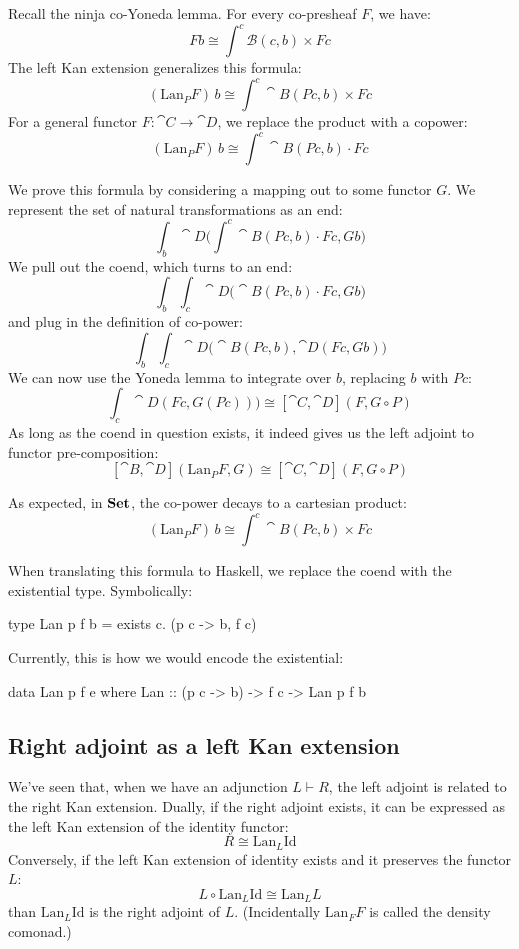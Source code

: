 \documentclass[DaoFP]{subfiles}
\begin{document}
Recall the ninja co-Yoneda lemma. For every co-presheaf $F$, we have:
\[ F b \cong \int^{c} \mathcal{B}(c, b) \times F c \]
The left Kan extension generalizes this formula:
\[ (\text{Lan}_P F)\, b \cong \int^{c} \cat B (P c, b) \times F c \]
For a general functor $F \colon \cat C \to \cat D$, we replace the product with a copower:
\[ (\text{Lan}_P F)\, b \cong \int^{c} \cat B(P c, b) \cdot F c \]

We prove this formula by considering a mapping out to some functor $G$. We represent the set of natural transformations as an end:
\[\int_b \cat D \big(\int^c \cat B(P c, b) \cdot F c, G b\big) \]
We pull out the coend, which turns to an end:
\[\int_b \int_c \cat D \big(\cat B(P c, b) \cdot F c, G b\big) \]
and plug in the definition of co-power:
\[\int_b \int_c \cat D \big(\cat B(P c, b), \cat D (F c, G b)\big) \]
We can now use the Yoneda lemma to integrate over $b$, replacing $b$ with $P c$:
\[\int_c \cat D (F c, G (P c))\big) \cong  [\cat C, \cat D] (F, G \circ P) \]
As long as the coend in question exists, it indeed gives us the left adjoint to functor pre-composition:
\[ [\cat B, \cat D](\text{Lan}_P F , G) \cong  [\cat C, \cat D] (F, G \circ P) \]

As expected, in $\mathbf{Set}$, the co-power decays to a cartesian product:
\[ (\text{Lan}_P F)\, b \cong \int^{c} \cat B (P c, b) \times F c \]

When translating this formula to Haskell, we replace the coend with the existential type. Symbolically:
 \begin{haskell}
 type Lan p f b = exists c. (p c -> b, f c)
 \end{haskell}
Currently, this is how we would encode the existential:
 \begin{haskell}
 data Lan p f e where
   Lan :: (p c -> b) -> f c -> Lan p f b
 \end{haskell}
 
\subsection{Right adjoint as a left Kan extension}

We've seen that, when we have an adjunction $L \vdash R$, the left adjoint is related to the right Kan extension. Dually, if the right adjoint exists, it can be expressed as the left Kan extension of the identity functor:
\[ R \cong \text{Lan}_L \text{Id} \]
Conversely, if the left Kan extension of identity exists and it preserves the functor $L$:
\[ L \circ \text{Lan}_L \text{Id} \cong \text{Lan}_L L \]
than $\text{Lan}_L \text{Id}$ is the right adjoint of $L$. (Incidentally $\text{Lan}_F F$ is called the density comonad.)
\end{document}
